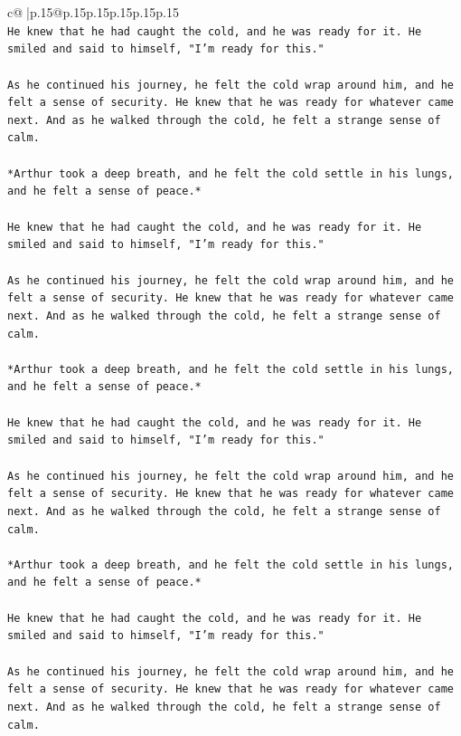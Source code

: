 \documentclass{article}
\begin{document}
{\begin{supertabular}{c@{$\;$}|p{.15\linewidth}@{}p{.15\linewidth}p{.15\linewidth}p{.15\linewidth}p{.15\linewidth}p{.15\linewidth}}
{{{\\ 
\texttt{He knew that he had caught the cold, and he was ready for it. He smiled and said to himself, "I'm ready for this."} \\
\\ 
\texttt{As he continued his journey, he felt the cold wrap around him, and he felt a sense of security. He knew that he was ready for whatever came next. And as he walked through the cold, he felt a strange sense of calm.} \\
\\ 
\texttt{*Arthur took a deep breath, and he felt the cold settle in his lungs, and he felt a sense of peace.*} \\
\\ 
\texttt{He knew that he had caught the cold, and he was ready for it. He smiled and said to himself, "I'm ready for this."} \\
\\ 
\texttt{As he continued his journey, he felt the cold wrap around him, and he felt a sense of security. He knew that he was ready for whatever came next. And as he walked through the cold, he felt a strange sense of calm.} \\
\\ 
\texttt{*Arthur took a deep breath, and he felt the cold settle in his lungs, and he felt a sense of peace.*} \\
\\ 
\texttt{He knew that he had caught the cold, and he was ready for it. He smiled and said to himself, "I'm ready for this."} \\
\\ 
\texttt{As he continued his journey, he felt the cold wrap around him, and he felt a sense of security. He knew that he was ready for whatever came next. And as he walked through the cold, he felt a strange sense of calm.} \\
\\ 
\texttt{*Arthur took a deep breath, and he felt the cold settle in his lungs, and he felt a sense of peace.*} \\
\\ 
\texttt{He knew that he had caught the cold, and he was ready for it. He smiled and said to himself, "I'm ready for this."} \\
\\ 
\texttt{As he continued his journey, he felt the cold wrap around him, and he felt a sense of security. He knew that he was ready for whatever came next. And as he walked through the cold, he felt a strange sense of calm.} \\
}}}
\end{supertabular}}
\end{document}
